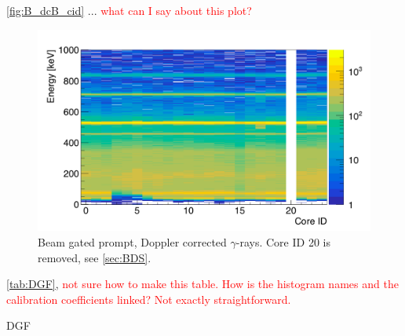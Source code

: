 \documentclass[twoside,english]{uiofysmaster/uiofysmaster}
\newcommand{\ga}{$\gamma$}
\let\orgautoref\autoref
\renewcommand{\autoref}
        {%
		 \def\sectionautorefname{Section}%
		 \def\subsectionautorefname{Section}%
		 \def\subsubsectionautorefname{Section}%
		 \def\chapterautorefname{Chapter}%
          \orgautoref}
\begin{document}
\autoref{fig:B_dcB_cid} ... \textcolor{red}{what can I say about this plot?}

\begin{figure}[ht]
	\centering
	\includegraphics[width=\textwidth]{../Plots/plotting/B_dcB_cid.png}
	\caption{Beam gated prompt, Doppler corrected \ga-rays. Core ID 20 is removed, see \autoref{sec:BDS}.}
	\label{fig:B_dcB_cid}
\end{figure}


\autoref{tab:DGF}, \textcolor{red}{not sure how to make this table. How is the histogram names and the calibration coefficients linked? Not exactly straightforward.}

\begin{table}[ht] 
	\centering 
	\caption{DGF}
	
	\label{tab:DGF}
\end{table}



\end{document}
